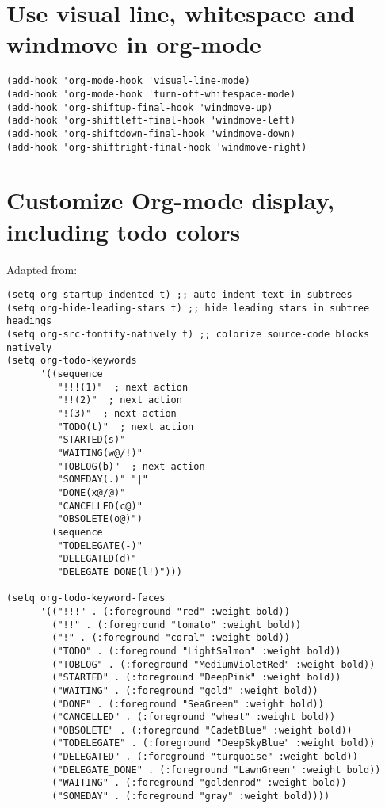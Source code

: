 \documentclass[10pt]{article}
\begin{document}
\section{Use visual line, whitespace and windmove in org-mode}
\label{sec-4}

\begin{verbatim}
(add-hook 'org-mode-hook 'visual-line-mode)
(add-hook 'org-mode-hook 'turn-off-whitespace-mode)
(add-hook 'org-shiftup-final-hook 'windmove-up)
(add-hook 'org-shiftleft-final-hook 'windmove-left)
(add-hook 'org-shiftdown-final-hook 'windmove-down)
(add-hook 'org-shiftright-final-hook 'windmove-right)
\end{verbatim}

\section{Customize Org-mode display, including todo colors}
\label{sec-5}

Adapted from:


\begin{verbatim}
(setq org-startup-indented t) ;; auto-indent text in subtrees
(setq org-hide-leading-stars t) ;; hide leading stars in subtree headings
(setq org-src-fontify-natively t) ;; colorize source-code blocks natively
(setq org-todo-keywords
      '((sequence
         "!!!(1)"  ; next action
         "!!(2)"  ; next action
         "!(3)"  ; next action
         "TODO(t)"  ; next action
         "STARTED(s)"
         "WAITING(w@/!)"
         "TOBLOG(b)"  ; next action
         "SOMEDAY(.)" "|"
         "DONE(x@/@)"
         "CANCELLED(c@)"
         "OBSOLETE(o@)")
        (sequence
         "TODELEGATE(-)"
         "DELEGATED(d)"
         "DELEGATE_DONE(l!)")))

(setq org-todo-keyword-faces
      '(("!!!" . (:foreground "red" :weight bold))
        ("!!" . (:foreground "tomato" :weight bold))
        ("!" . (:foreground "coral" :weight bold))
        ("TODO" . (:foreground "LightSalmon" :weight bold))
        ("TOBLOG" . (:foreground "MediumVioletRed" :weight bold))
        ("STARTED" . (:foreground "DeepPink" :weight bold))
        ("WAITING" . (:foreground "gold" :weight bold))
        ("DONE" . (:foreground "SeaGreen" :weight bold))
        ("CANCELLED" . (:foreground "wheat" :weight bold))
        ("OBSOLETE" . (:foreground "CadetBlue" :weight bold))
        ("TODELEGATE" . (:foreground "DeepSkyBlue" :weight bold))
        ("DELEGATED" . (:foreground "turquoise" :weight bold))
        ("DELEGATE_DONE" . (:foreground "LawnGreen" :weight bold))
        ("WAITING" . (:foreground "goldenrod" :weight bold))
        ("SOMEDAY" . (:foreground "gray" :weight bold))))
\end{verbatim}
\end{document}
